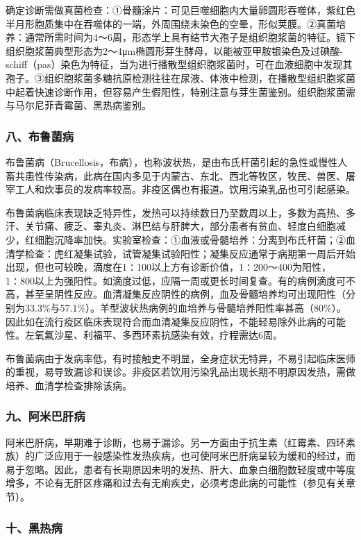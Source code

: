 确定诊断需做真菌检查：①骨髓涂片：可见巨噬细胞内大量卵圆形吞噬体，紫红色半月形胞质集中在吞噬体的一端，外周围绕未染色的空晕，形似荚膜。②真菌培养：通常所需时间为4～6周，形态学上具有结节大孢子是组织胞浆菌的特征。镜下组织胞浆菌典型形态为2～4μm椭圆形芽生酵母，以能被亚甲胺银染色及过碘酸-schiff（pas）染色为特征，当为进行播散型组织胞浆菌时，可在血液细胞中发现其孢子。③组织胞浆菌多糖抗原检测往往在尿液、体液中检测，在播散型组织胞浆菌中起着快速诊断作用，但容易产生假阳性，特别注意与芽生菌鉴别。组织胞浆菌需与马尔尼菲青霉菌、黑热病鉴别。

\subsubsection{八、布鲁菌病}

布鲁菌病（Brucellosis，布病），也称波状热，是由布氏杆菌引起的急性或慢性人畜共患性传染病，此病在国内多见于内蒙古、东北、西北等牧区，牧民、兽医、屠宰工人和炊事员的发病率较高。非疫区偶也有报道。饮用污染乳品也可引起感染。

布鲁菌病临床表现缺乏特异性，发热可以持续数日乃至数周以上，多数为高热、多汗、关节痛、疲乏、睾丸炎、淋巴结与肝脾大，部分患者有贫血、轻度白细胞减少，红细胞沉降率加快。实验室检查：①血液或骨髓培养：分离到布氏杆菌；②血清学检查：虎红凝集试验，试管凝集试验阳性；凝集反应通常于病期第一周后开始出现，但也可较晚，滴度在1∶100以上方有诊断价值，1∶200～400为阳性，1∶800以上为强阳性。如滴度过低，应隔一周或更长时间复查。有的病例滴度可不高，甚至呈阴性反应。血清凝集反应阴性的病例，血及骨髓培养均可出现阳性（分别为33.3\%与57.1\%）。羊型波状热病例的血培养与骨髓培养阳性率甚高（80\%）。因此如在流行疫区临床表现符合而血清凝集反应阴性，不能轻易除外此病的可能性。左氧氟沙星、利福平、多西环素抗感染有效，疗程需达6周。

布鲁菌病由于发病率低，有时接触史不明显，全身症状无特异，不易引起临床医师的重视，易导致漏诊和误诊。非疫区若饮用污染乳品出现长期不明原因发热，需做培养、血清学检查排除该病。

\subsubsection{九、阿米巴肝病}

阿米巴肝病，早期难于诊断，也易于漏诊。另一方面由于抗生素（红霉素、四环素族）的广泛应用于一般感染性发热疾病，也可使阿米巴肝病呈较为缓和的经过，而易于忽略。因此，患者有长期原因未明的发热、肝大、血象白细胞数轻度或中等度增多，不论有无肝区疼痛和过去有无痢疾史，必须考虑此病的可能性（参见有关章节）。

\subsubsection{十、黑热病}

